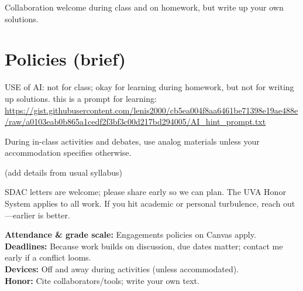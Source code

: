\documentclass[oneside,11pt]{amsart}
\begin{document}
Collaboration welcome during class and on homework, but write up your own solutions.







\section{Policies (brief)}


USE of AI: not for class; okay for learning during homework, but not for writing up solutions.
this is a prompt for learning: \url{https://gist.githubusercontent.com/lenis2000/cb5ea004f8aa6461be71398e19ae488e/raw/a0103eab0b865a1cedf2f3bf3c00d217bd294005/AI_hint_prompt.txt}

During in-class activities and debates, use analog materials unless your accommodation specifies otherwise.

(add details from usual syllabus)


SDAC letters are welcome; please share early so we can plan. The UVA Honor System applies to all work. If you hit academic or personal turbulence, reach out---earlier is better.

\textbf{Attendance \& grade scale:} Engagements policies on Canvas apply.\\
\textbf{Deadlines:} Because work builds on discussion, due dates matter; contact me early if a conflict looms.\\
\textbf{Devices:} Off and away during activities (unless accommodated).\\
\textbf{Honor:} Cite collaborators/tools; write your own text.
\end{document}
